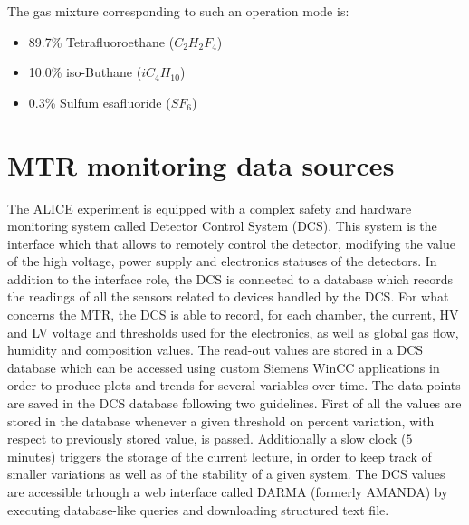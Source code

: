 
The gas mixture corresponding to such an operation mode is:
\begin{itemize}
\item 89.7\% Tetrafluoroethane ($C_2H_2F_4$)
\item 10.0\% iso-Buthane ($iC_4H_{10}$)
\item 0.3\% Sulfum esafluoride ($SF_6$)
\end{itemize}

\section{MTR monitoring data sources}
The ALICE experiment is equipped with a complex safety and hardware monitoring system called Detector Control System (DCS).
This system is the interface which that allows to remotely control the detector, modifying the value of the high voltage, power supply and electronics statuses of the detectors.
In addition to the interface role, the DCS is connected to a database which records the readings of all the sensors related to devices handled by the DCS.
For what concerns the MTR, the DCS is able to record, for each chamber, the current, HV and LV voltage and thresholds used for the electronics, as well as global gas flow, humidity and composition values.
The read-out values are stored in a DCS database which can be accessed using custom Siemens WinCC applications in order to produce plots and trends for several variables over time.
The data points are saved in the DCS database following two guidelines.
First of all the values are stored in the database whenever a given threshold on percent variation, with respect to previously stored value, is passed.
Additionally a slow clock ($5$ minutes) triggers the storage of the current lecture, in order to keep track of smaller variations as well as of the stability of a given system.
The DCS values are accessible trhough a web interface called DARMA (formerly AMANDA) by executing database-like queries and downloading structured text file.

